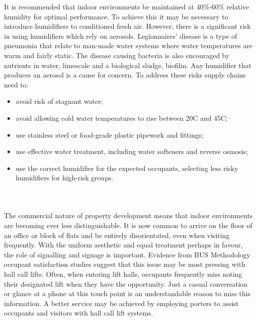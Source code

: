\documentclass[11pt, oneside]{book}   	%
\begin{document}
\pagebreak

It is recommended that indoor environments be maintained at 40\%-60\% relative humidity for optimal performance.
To achieve this it may be necessary to introduce humidifiers to conditioned fresh air.
However, there is a significant risk in using humidifiers which rely on aerosols.
Legionnaires' disease is a type of pneumonia that relate to man-made water systems where water temperatures are warm and fairly static.
The disease causing bacteria is also encouraged by nutrients in water, limescale and a biological sludge, biofilm.
Any humidifier that produces an aerosol is a cause for concern.
To address these risks supply chains need to:
\begin{itemize}
	\item avoid risk of stagnant water;
	\item avoid allowing cold water temperatures to rise between 20\textdegree C and 45\textdegree C;
	\item use stainless steel or food-grade plastic pipework and fittings;
	\item use effective water treatment, including water softeners and reverse osmosis;
	\item use the correct humidifier for the expected occupants, selecting less risky humidifiers for high-risk groups.
\end{itemize}\

\subsubsection{\color{Blue}{P3: Wayfinding within Workplaces}}
The commercial nature of property development means that indoor environments are becoming ever less distinguishable.
It is now common to arrive on the floor of an office or block of flats and be entirely disorientated, even when visiting frequently.
With the uniform aesthetic and equal treatment perhaps in favour, the role of signalling and signage is important.
Evidence from BUS Methodology occupant satisfaction studies suggest that this issue may be most pressing with hall call lifts.
Often, when entering lift halls, occupants frequently miss noting their designated lift when they have the opportunity.
Just a casual conversation or glance at a phone at this touch point is an understandable reason to miss this information.
A better service may be achieved by employing porters to assist occupants and visitors with hall call lift systems.\
\end{document}
